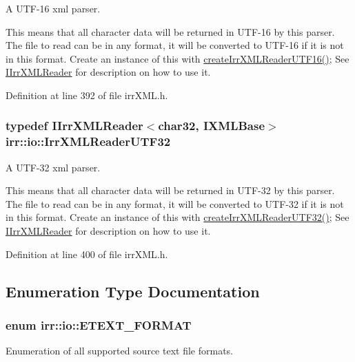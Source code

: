 A UTF-16 xml parser. 

This means that all character data will be returned in UTF-16 by this parser. The file to read can be in any format, it will be converted to UTF-16 if it is not in this format. Create an instance of this with \hyperlink{namespaceirr_1_1io_41c9d4c0d94702b3da2dca5799384443}{createIrrXMLReaderUTF16()}; See \hyperlink{classirr_1_1io_1_1_i_irr_x_m_l_reader}{IIrrXMLReader} for description on how to use it. 

Definition at line 392 of file irrXML.h.\hypertarget{namespaceirr_1_1io_70f411ff403636fb5c4e9becb090d5ec}{
\subsubsection[{IrrXMLReaderUTF32}]{\setlength{\rightskip}{0pt plus 5cm}typedef {\bf IIrrXMLReader}$<${\bf char32}, {\bf IXMLBase}$>$ {\bf irr::io::IrrXMLReaderUTF32}}}
\label{namespaceirr_1_1io_70f411ff403636fb5c4e9becb090d5ec}


A UTF-32 xml parser. 

This means that all character data will be returned in UTF-32 by this parser. The file to read can be in any format, it will be converted to UTF-32 if it is not in this format. Create an instance of this with \hyperlink{namespaceirr_1_1io_42c53128ecf88af927030b6b9ea5afc2}{createIrrXMLReaderUTF32()}; See \hyperlink{classirr_1_1io_1_1_i_irr_x_m_l_reader}{IIrrXMLReader} for description on how to use it. 

Definition at line 400 of file irrXML.h.

\subsection{Enumeration Type Documentation}
\hypertarget{namespaceirr_1_1io_c7e51e5a6bd00451dec248f497b16a9d}{
\subsubsection[{ETEXT\_\-FORMAT}]{\setlength{\rightskip}{0pt plus 5cm}enum {\bf irr::io::ETEXT\_\-FORMAT}}}
\label{namespaceirr_1_1io_c7e51e5a6bd00451dec248f497b16a9d}


Enumeration of all supported source text file formats. 

